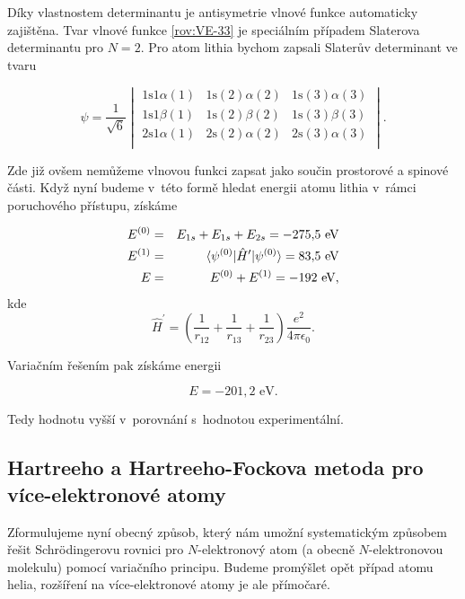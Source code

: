 \noindent Díky vlastnostem determinantu je antisymetrie vlnové funkce automaticky zajištěna. Tvar vlnové funkce \eqref{rov:VE-33} je speciálním případem Slaterova determinantu pro $N=2$. Pro atom lithia bychom zapsali Slaterův determinant ve tvaru

\begin{equation}
\psi = \frac{1}{\sqrt{6}}
\begin{vmatrix}
1 \mathrm{s}1 \alpha(1) & 1 \mathrm{s}(2) \alpha (2) & 1 \mathrm{s}(3) \alpha (3) \\
1 \mathrm{s}1 \beta(1) & 1 \mathrm{s}(2) \beta (2) & 1 \mathrm{s}(3) \beta (3) \\
2 \mathrm{s}1 \alpha(1) & 2 \mathrm{s}(2) \alpha (2) & 2 \mathrm{s}(3) \alpha (3) \\
\end{vmatrix}.
\label{rov:VE-38}
\end{equation}


\noindent Zde již ovšem nemůžeme vlnovou funkci zapsat jako součin prostorové a spinové části. Když nyní budeme v~této formě hledat energii atomu lithia v~rámci poruchového přístupu, získáme

\begin{eqnarray*}
E^{(0)} &=& E_{1s} + E_{1s} + E_{2s} = -275{,}5 \mbox{ eV} \\
E^{(1)} &=& \braket{\psi^{(0)}|\hat{H}^{\prime}|\psi^{(0)}} = 83{,}5 \mbox{ eV}\\
E &=& E^{(0)} + E^{(1)} = -192 \mbox{ eV},
\end{eqnarray*}
kde
\begin{equation}
\hat{H}^{\prime} = \left( \frac{1}{r_{12}} + \frac{1}{r_{13}} + \frac{1}{r_{23}} \right) \frac{e^2}{4 \pi \epsilon_0}.  \nonumber
\end{equation}

\noindent Variačním řešením pak získáme energii

\begin{equation}
E = - 201{,}2 \mbox{ eV}. \nonumber
\end{equation}

\noindent Tedy hodnotu vyšší v~porovnání s~hodnotou experimentální. 


\subsection{Hartreeho a Hartreeho-Fockova metoda pro více-elektronové atomy}
 
Zformulujeme nyní obecný způsob, který nám umožní systematickým způsobem řešit Schr\"odingerovu rovnici pro $N$-elektronový atom (a obecně $N$-elektronovou molekulu) pomocí variačního principu. Budeme promýšlet opět případ atomu helia, rozšíření na více-elektronové atomy je ale přímočaré. 


